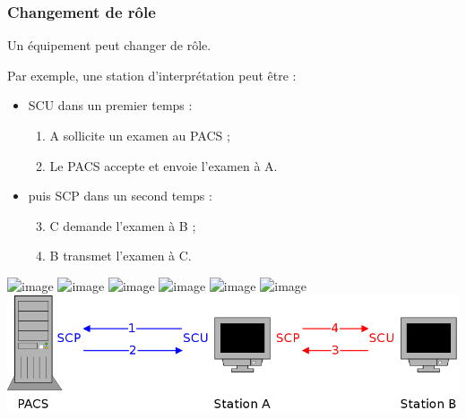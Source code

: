 \frame
{
	\frametitle{Changement de r\^ole}
	Un \'equipement peut changer de r\^ole.
	
	Par exemple, une station d'interpr\'etation peut \^etre :
	\begin{itemize}
		\item<2-> SCU dans un premier temps :
		\begin{enumerate}
			\item<3-> A sollicite un examen au PACS ;
			\item<4-> Le PACS accepte et envoie l'examen \`a A.
		\end{enumerate}
		\item<5-> puis SCP dans un second temps :
		\begin{enumerate}
		\setcounter{enumi}{2}
			\item<6-> C demande l'examen \`a B ;
			\item<7-> B transmet l'examen \`a C.
		\end{enumerate}
	\end{itemize}
	
	\includegraphics<1>[width=\linewidth]{./figures/roles.png}
	\includegraphics<2>[width=\linewidth]{./figures/roles-scu.png}
	\includegraphics<3>[width=\linewidth]{./figures/roles-1.png}
	\includegraphics<4>[width=\linewidth]{./figures/roles-2.png}
	\includegraphics<5>[width=\linewidth]{./figures/roles-scp.png}
	\includegraphics<6>[width=\linewidth]{./figures/roles-3.png}
	\includegraphics[width=\linewidth]{./figures/roles-4.png}
}
